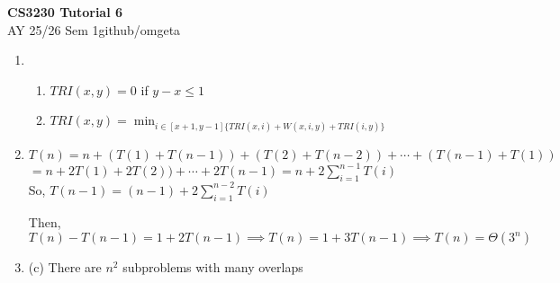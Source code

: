\documentclass[12pt, a4paper]{article}
\newcommand{\mytitle}{CS3230 Tutorial 6}
\newcommand{\myauthor}{github/omgeta}
\newcommand{\mydate}{AY 25/26 Sem 1}
\begin{document}
\raggedright
\footnotesize
\begin{center}
{\normalsize{\textbf{\mytitle}}} \\
{\footnotesize{\mydate\hspace{2pt}\textemdash\hspace{2pt}\myauthor}}
\end{center}
\begin{enumerate}[Q\arabic*).]
  \item 
    \begin{enumerate}[(\alph*)]
      \item $TRI(x,y) = 0$ if $y-x \leq 1$
      \item $TRI(x,y) = \min_{i\in [x+1, y-1]\{TRI(x, i) + W(x, i, y) + TRI(i, y)\}}$
    \end{enumerate}

  \item $T(n) = n + (T(1) + T(n-1)) + (T(2) + T(n-2)) + \cdots + (T(n-1) + T(1))$\\$= n + 2T(1) + 2T(2)) + \cdots + 2T(n-1) = n + 2\sum^{n-1}_{i=1}T(i)$\\ 
    So, $T(n-1) = (n-1)+ 2\sum^{n-2}_{i=1}T(i)$

    Then, $T(n) - T(n-1) = 1 + 2T(n-1) \implies T(n) = 1 + 3T(n-1) \implies T(n) = \Theta(3^n)$

  \item (c) There are $n^2$ subproblems with many overlaps

\end{enumerate}
\end{document}
